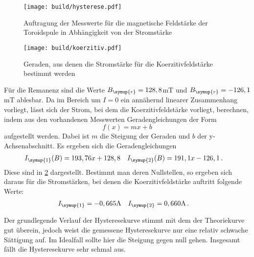 \begin{figure}
  \centering
  \texttt{[image: build/hysterese.pdf]}
  \caption{Auftragung der Messwerte für die magnetische Feldstärke der Toroidspule
  in Abhängigkeit von der Stromstärke}
  \label{fig:hysterese}
\end{figure}

\begin{figure}
  \centering
  \texttt{[image: build/koerzitiv.pdf]}
  \caption{Geraden, aus denen die Stromstärke für die Koerzitivfeldstärke bestimmt werden}
  \label{fig:koerzitiv}
\end{figure}


Für die Remanenz sind die Werte $B_{\symup{r}}=128,8$mT und $B_{\symup{r}}=-126,1$mT
ablesbar. Da im Bereich um $I=0$ ein annähernd linearer Zusammenhang vorliegt, lässt
sich der Strom, bei dem die Koerzitivfeldstärke vorliegt, berechnen, indem aus den vorhandenen
Messwerten Geradengleichungen der Form
\begin{equation}
  f(x)=mx+b
  \end{equation}
aufgestellt werden. Dabei ist $m$ die Steigung der Geraden und $b$ der y-Achsenabschnitt.
Es ergeben sich die Geradengleichungen
\begin{align}
  I_{\symup{1}}(B)&=193,76x+128,8 & I_{\symup{2}}(B)&=191,1x-126,1\,.
\end{align}
Diese sind in \ref{fig:koerzitiv} dargestellt.
Bestimmt man deren Nullstellen, so ergeben sich daraus für die Stromstärken, bei
denen die Koerzitivfeldstärke auftritt folgende Werte:
\begin{align}
  I_{\symup{1}}&=-0,665\text{A} & I_{\symup{2}}&=0,660\text{A}\,.
\end{align}


Der grundlegende Verlauf der Hysteresekurve stimmt mit dem der Theoriekurve gut überein, jedoch weist
die gemessene Hysteresekurve nur eine relativ schwache Sättigung auf. Im Idealfall sollte
hier die Steigung gegen null gehen. Insgesamt fällt die Hysteresekurve sehr schmal aus.

